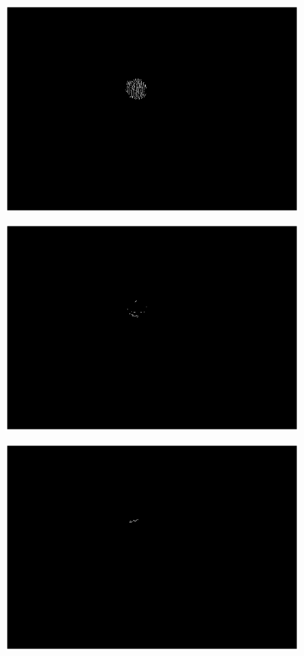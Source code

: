 \begin{figure}
	\centering
	\includegraphics[width=1\linewidth]{visio/graficasderesultados/dix1}
	\caption{}
	\label{fig:dix1}
\end{figure}
\begin{figure}
	\centering
	\includegraphics[width=1\linewidth]{visio/graficasderesultados/diy1}
	\caption{}
	\label{fig:diy1}
\end{figure}
\begin{figure}
	\centering
	\includegraphics[width=1\linewidth]{visio/graficasderesultados/diz1}
	\caption{}
	\label{fig:diz1}
\end{figure}
